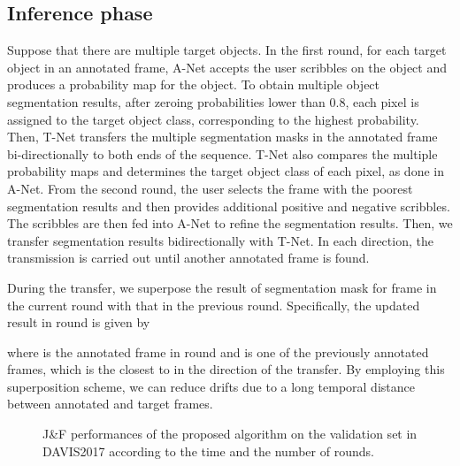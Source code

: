 \documentclass[runningheads]{llncs}
\begin{document}
\subsection{Inference phase} \label{subsec:Inference}
Suppose that there are multiple target objects. In the first round, for each target object in an annotated frame, A-Net accepts the user scribbles on the object and produces a probability map for the object. To obtain multiple object segmentation results, after zeroing probabilities lower than 0.8, each pixel is assigned to the target object class, corresponding to the highest probability. Then, T-Net transfers the multiple segmentation masks in the annotated frame bi-directionally to both ends of the sequence. T-Net also compares the multiple probability maps and determines the target object class of each pixel, as done in A-Net. From the second round, the user selects the frame with the poorest segmentation results and then provides additional positive and negative scribbles. The scribbles are then fed into A-Net to refine the segmentation results. Then, we transfer segmentation results bidirectionally with T-Net. In each direction, the transmission is carried out until another annotated frame is found.


During the transfer, we superpose the result of segmentation mask  for frame  in the current round  with that  in the previous round. Specifically, the updated result  in round  is given by


where  is the annotated frame in round  and  is one of the previously annotated frames, which is the closest to  in the direction of the transfer. By employing this superposition scheme, we can reduce drifts due to a long temporal distance between annotated and target frames.


\begin{figure}[t]
\centering
\caption{J\&F performances of the proposed algorithm on the validation set in DAVIS2017 according to the time and the number of rounds.}
\label{fig:graph}
\end{figure}
\end{document}
